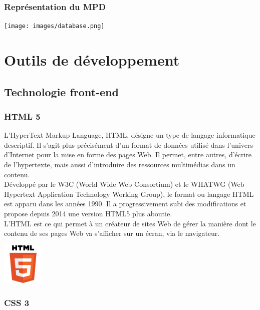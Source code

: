 				\subsubsection{Représentation du MPD}
					\texttt{[image: images/database.png]}
					\label{modèle physique des données}
	\section{Outils de développement}
		\subsection{Technologie front-end}
			\subsubsection{HTML 5}
				L'HyperText Markup Language, HTML, désigne un type de langage informatique descriptif. Il s'agit plus précisément d'un format de données utilisé dans l'univers d'Internet pour la mise en forme des pages Web. Il permet, entre autres, d'écrire de l'hypertexte, mais aussi d'introduire des ressources multimédias dans un contenu.\\
				
				Développé par le W3C (World Wide Web Consortium) et le WHATWG (Web Hypertext Application Technology Working Group), le format ou langage HTML est apparu dans les années 1990. Il a progressivement subi des modifications et propose depuis 2014 une version HTML5 plus aboutie.\\
				
				L'HTML est ce qui permet à un créateur de sites Web de gérer la manière dont le contenu de ses pages Web va s'afficher sur un écran, via le navigateur.\cite{definition_html}
				
				\begin{center}
					\includegraphics[width=2cm]{chap_2/html5.png}
					\label{figure5}
				\end{center}
			
			\subsubsection{CSS 3}
			
